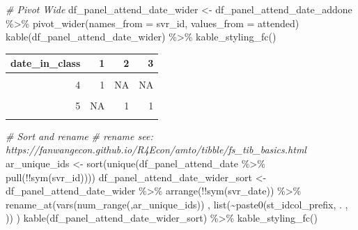 \documentclass[
]{book}
\newenvironment{Shaded}{\begin{snugshade}}{\end{snugshade}}
\newcommand{\AttributeTok}[1]{\textcolor[rgb]{0.77,0.63,0.00}{#1}}
\newcommand{\CommentTok}[1]{\textcolor[rgb]{0.56,0.35,0.01}{\textit{#1}}}
\newcommand{\FunctionTok}[1]{\textcolor[rgb]{0.00,0.00,0.00}{#1}}
\newcommand{\NormalTok}[1]{#1}
\newcommand{\OtherTok}[1]{\textcolor[rgb]{0.56,0.35,0.01}{#1}}
\newcommand{\SpecialCharTok}[1]{\textcolor[rgb]{0.00,0.00,0.00}{#1}}
\newcommand{\StringTok}[1]{\textcolor[rgb]{0.31,0.60,0.02}{#1}}
\begin{document}
\begin{Shaded}
\begin{Highlighting}[]
\CommentTok{\# Pivot Wide}
\NormalTok{df\_panel\_attend\_date\_wider }\OtherTok{\textless{}{-}}\NormalTok{ df\_panel\_attend\_date\_addone }\SpecialCharTok{\%\textgreater{}\%}
  \FunctionTok{pivot\_wider}\NormalTok{(}\AttributeTok{names\_from =}\NormalTok{ svr\_id,}
              \AttributeTok{values\_from =}\NormalTok{ attended)}
\FunctionTok{kable}\NormalTok{(df\_panel\_attend\_date\_wider) }\SpecialCharTok{\%\textgreater{}\%}
  \FunctionTok{kable\_styling\_fc}\NormalTok{()}
\end{Highlighting}
\end{Shaded}

\begin{table}[!h]
\centering
\begin{tabular}{r|r|r|r}
\hline
date\_in\_class & 1 & 2 & 3\\
\hline
\cellcolor{gray!6}{2} & \cellcolor{gray!6}{1} & \cellcolor{gray!6}{1} & \cellcolor{gray!6}{1}\\
\hline
4 & 1 & NA & NA\\
\hline
\cellcolor{gray!6}{1} & \cellcolor{gray!6}{NA} & \cellcolor{gray!6}{1} & \cellcolor{gray!6}{NA}\\
\hline
5 & NA & 1 & 1\\
\hline
\cellcolor{gray!6}{3} & \cellcolor{gray!6}{NA} & \cellcolor{gray!6}{NA} & \cellcolor{gray!6}{1}\\
\hline
\end{tabular}
\end{table}

\begin{Shaded}
\begin{Highlighting}[]
\CommentTok{\# Sort and rename}
\CommentTok{\# rename see: https://fanwangecon.github.io/R4Econ/amto/tibble/fs\_tib\_basics.html}
\NormalTok{ar\_unique\_ids }\OtherTok{\textless{}{-}} \FunctionTok{sort}\NormalTok{(}\FunctionTok{unique}\NormalTok{(df\_panel\_attend\_date }\SpecialCharTok{\%\textgreater{}\%} \FunctionTok{pull}\NormalTok{(}\SpecialCharTok{!!}\FunctionTok{sym}\NormalTok{(svr\_id))))}
\NormalTok{df\_panel\_attend\_date\_wider\_sort }\OtherTok{\textless{}{-}}\NormalTok{ df\_panel\_attend\_date\_wider }\SpecialCharTok{\%\textgreater{}\%}
    \FunctionTok{arrange}\NormalTok{(}\SpecialCharTok{!!}\FunctionTok{sym}\NormalTok{(svr\_date)) }\SpecialCharTok{\%\textgreater{}\%}
    \FunctionTok{rename\_at}\NormalTok{(}\FunctionTok{vars}\NormalTok{(}\FunctionTok{num\_range}\NormalTok{(}\StringTok{\textquotesingle{}\textquotesingle{}}\NormalTok{,ar\_unique\_ids))}
\NormalTok{              , }\FunctionTok{list}\NormalTok{(}\SpecialCharTok{\textasciitilde{}}\FunctionTok{paste0}\NormalTok{(st\_idcol\_prefix, . , }\StringTok{\textquotesingle{}\textquotesingle{}}\NormalTok{))}
\NormalTok{              )}
\FunctionTok{kable}\NormalTok{(df\_panel\_attend\_date\_wider\_sort) }\SpecialCharTok{\%\textgreater{}\%}
  \FunctionTok{kable\_styling\_fc}\NormalTok{()}
\end{Highlighting}
\end{Shaded}
\end{document}
